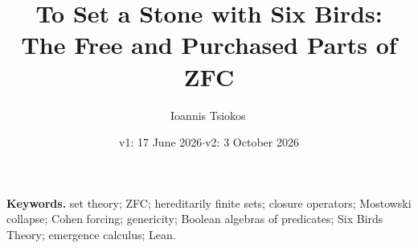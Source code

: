 \documentclass[11pt]{article}
\title{To Set a Stone with Six Birds:\\
The Free and Purchased Parts of ZFC}
\author{Ioannis Tsiokos\,\orcidlink{0009-0009-7659-5964}}
\date{v1: 17 June 2026\quad$\cdot$\quad v2: 3 October 2026}
\theoremstyle{definition}
\begin{document}
\maketitle
\thispagestyle{firstpage}



\medskip
\noindent\textbf{Keywords.} set theory; ZFC; hereditarily finite sets; closure operators; Mostowski collapse; Cohen forcing; genericity; Boolean algebras of predicates; Six Birds Theory; emergence calculus; Lean.













\appendix








\end{document}
